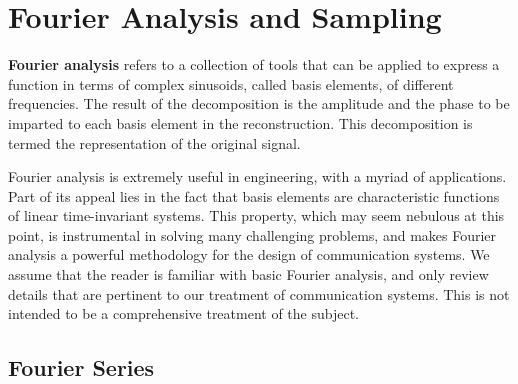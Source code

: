 \chapter{Fourier Analysis and Sampling}
\label{chapter:FourierAnalysisSampling}

\textbf{Fourier analysis} refers to a collection of tools that can be applied to express a function in terms of complex sinusoids, called basis elements, of different frequencies.
The result of the decomposition is the amplitude and the phase to be imparted to each basis element in the reconstruction.
This decomposition is termed the  representation of the original signal.

Fourier analysis is extremely useful in engineering, with a myriad of applications.
Part of its appeal lies in the fact that basis elements are characteristic functions of linear time-invariant systems.
This property, which may seem nebulous at this point, is instrumental in solving many challenging problems, and makes Fourier analysis a powerful methodology for the design of communication systems.
We assume that the reader is familiar with basic Fourier analysis, and only review details that are pertinent to our treatment of communication systems.
This is not intended to be a comprehensive treatment of the subject.


\section{Fourier Series}
\label{section:FourierSeries}

